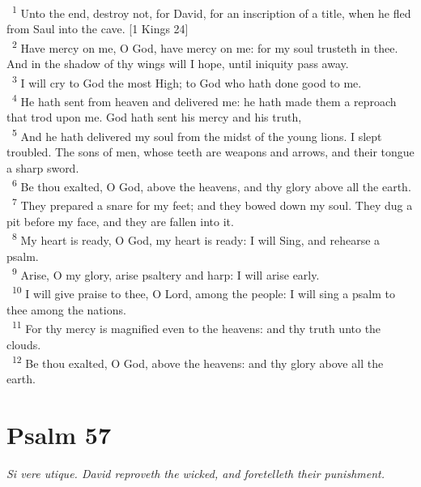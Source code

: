 \documentclass[a5paper,12pt]{article}
\begin{document}
\begin{multicols*}{2}
~\textsuperscript{1} Unto the end, destroy not, for David, for an inscription of a title, when he fled from Saul into the cave. [1 Kings 24]\\
~\textsuperscript{2} Have mercy on me, O God, have mercy on me: for my soul trusteth in thee. And in the shadow of thy wings will I hope, until iniquity pass away.\\
~\textsuperscript{3} I will cry to God the most High; to God who hath done good to me.\\
~\textsuperscript{4} He hath sent from heaven and delivered me: he hath made them a reproach that trod upon me. God hath sent his mercy and his truth,\\
~\textsuperscript{5} And he hath delivered my soul from the midst of the young lions. I slept troubled. The sons of men, whose teeth are weapons and arrows, and their tongue a sharp sword.\\
~\textsuperscript{6} Be thou exalted, O God, above the heavens, and thy glory above all the earth.\\
~\textsuperscript{7} They prepared a snare for my feet; and they bowed down my soul. They dug a pit before my face, and they are fallen into it.\\
~\textsuperscript{8} My heart is ready, O God, my heart is ready: I will Sing, and rehearse a psalm.\\
~\textsuperscript{9} Arise, O my glory, arise psaltery and harp: I will arise early.\\
~\textsuperscript{10} I will give praise to thee, O Lord, among the people: I will sing a psalm to thee among the nations.\\
~\textsuperscript{11} For thy mercy is magnified even to the heavens: and thy truth unto the clouds.\\
~\textsuperscript{12} Be thou exalted, O God, above the heavens: and thy glory above all the earth.\\

\section{Psalm 57}
\label{sec:org5a1cd00}
\emph{Si vere utique. David reproveth the wicked, and foretelleth their punishment.}\\


\end{multicols*}
\end{document}
